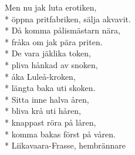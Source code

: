 \begin{SongText}[Gällivarevisan]
\begin{SongVerse}
        Men nu jak luta erotiken,\\*%
        öppna pritfabriken, sälja akvavit.\\*%
        Då komma pålismästarn nära,\\*%
        fråka om jak pära priten.\\*%
        De vara jäklika token,\\*%
        pliva hånkad av snoken,\\*%
        åka Luleå-kroken,\\*%
        längta baka uti skoken.\\*%
        Sitta inne halva åren,\\*%
        bliva krå uti håren,\\*%
        knappast röra på låren,\\*%
        komma bakas först på våren.\\*%
        Liikavaara-Frasse, hembrännare
    \end{SongVerse}
\end{SongText}
